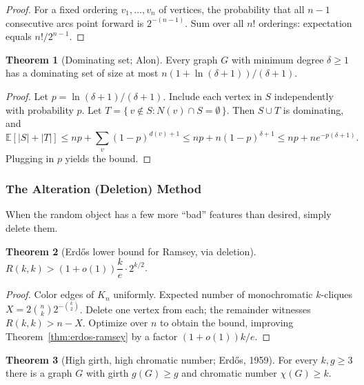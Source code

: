\documentclass{article}
\theoremstyle{definition}
\newtheorem{theorem}{Theorem}
\begin{document}
\begin{proof}
For a fixed ordering $v_1, \dots, v_n$ of vertices, the probability
that all $n - 1$ consecutive arcs point forward is $2^{-(n - 1)}$.
Sum over all $n!$ orderings: expectation equals $n!/2^{n - 1}$.
\end{proof}

\begin{theorem}[Dominating set; Alon]
Every graph $G$ with minimum degree $\delta \ge 1$ has a dominating
set of size at most $n(1 + \ln(\delta + 1))/(\delta + 1)$.
\end{theorem}

\begin{proof}
Let $p = \ln(\delta + 1)/(\delta + 1)$. Include each vertex in $S$
independently with probability $p$. Let $T = \{\, v \notin S : N(v) \cap S = \emptyset \,\}$.
Then $S \cup T$ is dominating, and
\[
  \mathbb{E}[|S| + |T|]
  \le np + \sum_v (1 - p)^{d(v) + 1}
  \le np + n(1 - p)^{\delta + 1}
  \le np + n e^{-p(\delta + 1)}.
\]
Plugging in $p$ yields the bound.
\end{proof}

\subsubsection{The Alteration (Deletion) Method}

When the random object has a few more ``bad'' features than desired,
simply delete them.

\begin{theorem}[Erd\H{o}s lower bound for Ramsey, via deletion]
$R(k, k) > (1 + o(1)) \dfrac{k}{e} \cdot 2^{k/2}$.
\end{theorem}

\begin{proof}
Color edges of $K_n$ uniformly. Expected number of monochromatic
$k$-cliques $X = 2\binom{n}{k} 2^{-\binom{k}{2}}$. Delete one vertex
from each; the remainder witnesses $R(k, k) > n - X$. Optimize over
$n$ to obtain the bound, improving Theorem~\ref{thm:erdos-ramsey} by
a factor $(1 + o(1))k/e$.
\end{proof}

\begin{theorem}[High girth, high chromatic number; Erd\H{o}s, 1959]\label{thm:girthchromatic}
For every $k, g \ge 3$ there is a graph $G$ with girth $g(G) \ge g$
and chromatic number $\chi(G) \ge k$.
\end{theorem}
\end{document}
